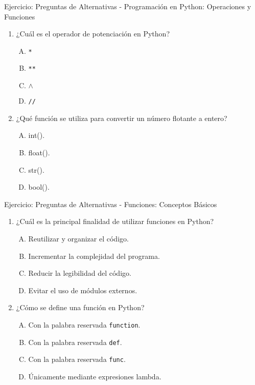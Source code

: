 \documentclass[10pt]{beamer}
\begin{document}
\begin{frame}{Ejercicio: Preguntas de Alternativas - Programación en Python: Operaciones y Funciones} 
    \begin{enumerate} 
        \item ¿Cuál es el operador de potenciación en Python? 
        \begin{enumerate}[A)] 
            \item \texttt{*} 
            \item \texttt{**} 
            \item \texttt{$\wedge$} 
            \item \texttt{//} 
        \end{enumerate} 
        \item ¿Qué función se utiliza para convertir un número flotante a entero? 
        \begin{enumerate}[A)] 
            \item int(). 
            \item float(). 
            \item str(). 
            \item bool(). 
        \end{enumerate} 
    \end{enumerate}
\end{frame}

\begin{frame}{Ejercicio: Preguntas de Alternativas - Funciones: Conceptos Básicos} 
    \begin{enumerate} 
        \item ¿Cuál es la principal finalidad de utilizar funciones en Python? 
        \begin{enumerate}[A)] 
            \item Reutilizar y organizar el código. 
            \item Incrementar la complejidad del programa. 
            \item Reducir la legibilidad del código. 
            \item Evitar el uso de módulos externos. 
        \end{enumerate} 
        \item ¿Cómo se define una función en Python? 
        \begin{enumerate}[A)] 
            \item Con la palabra reservada \texttt{function}. 
            \item Con la palabra reservada \texttt{def}. 
            \item Con la palabra reservada \texttt{func}. 
            \item Únicamente mediante expresiones lambda. 
        \end{enumerate} 
    \end{enumerate} 
\end{frame}
\end{document}
